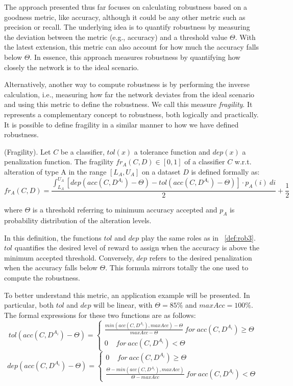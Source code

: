 The approach presented thus far focuses on calculating robustness based on a goodness metric, like accuracy, although it could be any other metric such as precision or recall. The underlying idea is to quantify robustness by measuring the deviation between the metric (e.g., accuracy) and a threshold value $\Theta$. With the latest extension, this metric can also account for how much the accuracy falls below $\Theta$. In essence, this approach measures robustness by quantifying how closely the network is to the ideal scenario.

Alternatively, another way to compute robustness is by performing the inverse calculation, i.e., measuring how far the network deviates from the ideal scenario and using this metric to define the robustness. We call this measure \textit{fragility}. It represents a complementary concept to robustness, both logically and practically. It is possible to define fragility in a similar manner to how we have defined robustness.

\begin{definition} (Fragility).
	Let $C$ be a classifier, $tol(x)$ a tolerance function and $dep(x)$ a penalization function.
	The fragility $fr_A(C,D) \in [0,1]$ of a classifier $C$ w.r.t. alteration of type A in the range $[L_A, U_A]$ on a dataset $D$ is defined formally as:
	\[
		fr_A(C,D) = \frac{\int_{L_A}^{U_A} [dep(acc(C,D^{A_i}) - \Theta) - tol(acc(C,D^{A_i}) - \Theta)] \cdot p_A(i)\ di}{2} + \frac{1}{2}
	\]
	
	where $\Theta$ is a threshold referring to minimum accuracy accepted and $p_A$ is probability distribution of the alteration levels.
\end{definition}

In this definition, the functions $tol$ and $dep$ play the same roles as in \Def~\ref{def:rob3}.$tol$ quantifies the desired level of reward to assign when the accuracy is above the minimum accepted threshold. Conversely, $dep$ refers to the desired penalization when the accuracy falls below $\Theta$. This formula mirrors totally the one used to compute the robustness.

To better understand this metric, an application example will be presented. In particular, both $tol$ and $dep$ will be linear, with $\Theta= 85\%$ and $maxAcc = 100 \%$. The formal expressions for these two functions are as follows:
\[
	tol(acc(C,D^{A_i}) - \Theta) = \begin{cases}
		\frac{min(acc(C,D^{A_i}), maxAcc) - \Theta}{maxAcc - \Theta}  \ for  \ acc(C,D^{A_i}) \ge \Theta\\
		0  \ \ \ \ \ for  \ acc(C,D^{A_i}) < \Theta
	\end{cases}
\]
\[
	dep(acc(C,D^{A_i}) - \Theta) = \begin{cases}
		0 \ \ \ \ \ for \ acc(C,D^{A_i}) \ge \Theta\\
		\frac{\Theta - min(acc(C,D^{A_i}), maxAcc)}{\Theta - maxAcc} \ for  \ acc(C,D^{A_i}) < \Theta
	\end{cases}
\]

